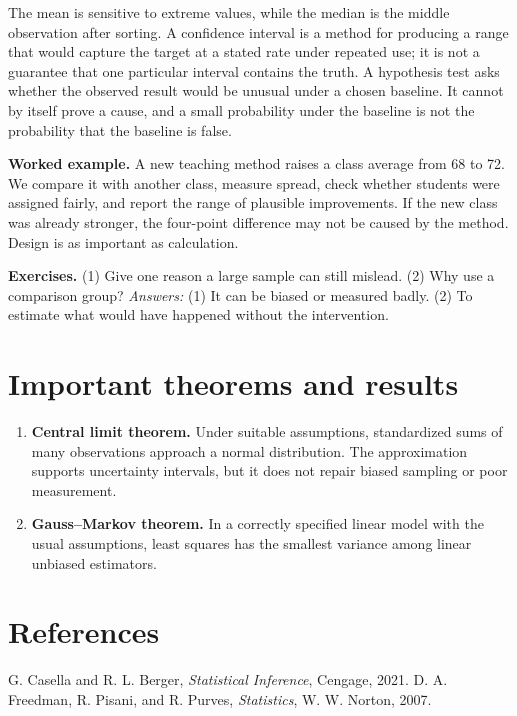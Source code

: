 \documentclass[11pt,oneside]{book}
\makeatletter
\renewenvironment{thebibliography}[1]
  {\list{\@biblabel{\@arabic\c@enumiv}}%
    {\settowidth\labelwidth{\@biblabel{#1}}%
     \leftmargin\labelwidth
     \advance\leftmargin\labelsep
     \usecounter{enumiv}%
     \let\p@enumiv\@empty
     \renewcommand\theenumiv{\@arabic\c@enumiv}}}
  {\endlist}
\makeatother
\begin{document}
The mean is sensitive to extreme values, while the median is the middle observation after sorting. A confidence interval is a method for producing a range that would capture the target at a stated rate under repeated use; it is not a guarantee that one particular interval contains the truth. A hypothesis test asks whether the observed result would be unusual under a chosen baseline. It cannot by itself prove a cause, and a small probability under the baseline is not the probability that the baseline is false.

\textbf{Worked example.} A new teaching method raises a class average from 68 to 72. We compare it with another class, measure spread, check whether students were assigned fairly, and report the range of plausible improvements. If the new class was already stronger, the four-point difference may not be caused by the method. Design is as important as calculation.

\textbf{Exercises.} (1) Give one reason a large sample can still mislead. (2) Why use a comparison group? \emph{Answers:} (1) It can be biased or measured badly. (2) To estimate what would have happened without the intervention.

\section*{Important theorems and results}
\begin{enumerate}[leftmargin=*,itemsep=0.35em]
\item \textbf{Central limit theorem.} Under suitable assumptions, standardized sums of many observations approach a normal distribution. The approximation supports uncertainty intervals, but it does not repair biased sampling or poor measurement.

\item \textbf{Gauss--Markov theorem.} In a correctly specified linear model with the usual assumptions, least squares has the smallest variance among linear unbiased estimators.
\end{enumerate}

\section*{References}
\begin{thebibliography}{9}
 G. Casella and R. L. Berger, \emph{Statistical Inference}, Cengage, 2021.
 D. A. Freedman, R. Pisani, and R. Purves, \emph{Statistics}, W. W. Norton, 2007.
\end{thebibliography}
\end{document}
